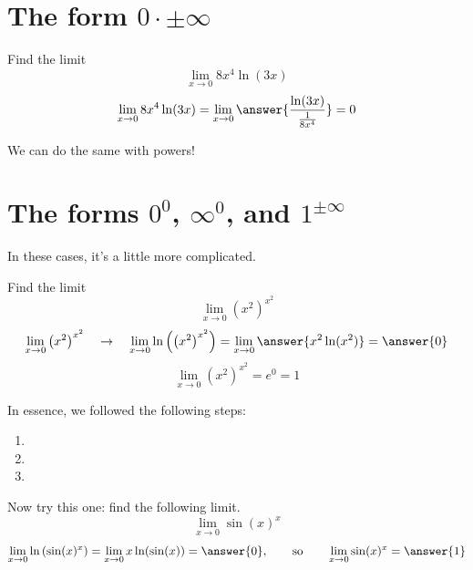 \documentclass{ximera}
\begin{document}
\section{The form $0 \cdot \pm \infty$}

\begin{example}\label{example:10-13}
Find the limit
\[
\lim _{x \rightarrow 0} 8 x^{4} \ln (3 x)
\]
\[
\lim _{x \rightarrow 0} 8 x^{4} \ln (3 x)=\lim _{x \rightarrow 0}\answer{\frac{\ln(3x)}{\frac{1}{8x^{4}}}}=0
\]
\end{example}

We can do the same with powers!

\section{The forms $0^{0}$, $\infty^{0}$, and $1^{ \pm \infty}$}

In these cases, it's a little more complicated.

\begin{example}\label{example:10-14}
Find the limit
\[
\lim _{x \rightarrow 0}\left(x^{2}\right)^{x^{2}}
\]
\[
\lim _{x \rightarrow 0}\left(x^{2}\right)^{x^{2}} \quad \rightarrow \quad \lim _{x \rightarrow 0}\ln\left(\left(x^{2}\right)^{x^{2}}\right)=\lim _{x \rightarrow 0}\answer{x^{2}\ln(x^{2})}=\answer{0}
\]
\[
\lim _{x \rightarrow 0}\left(x^{2}\right)^{x^{2}} = e^{0} = 1
\]
\end{example}

In essence, we followed the following steps:

\begin{enumerate}
  \item {}
  \item {}
  \item {}
\end{enumerate}

\begin{exercise}\label{exercise:10-15}
Now try this one: find the following limit.
\[
\lim _{x \rightarrow 0} \sin (x)^{x}
\]
\[
\lim _{x \rightarrow 0}\ln\left(\sin (x)^{x}\right)=\lim _{x \rightarrow 0} x\ln(\sin(x))=\answer{0}, \qquad\text{so}\qquad \lim _{x \rightarrow 0} \sin (x)^{x}=\answer{1}
\]
\end{exercise}
\end{document}
